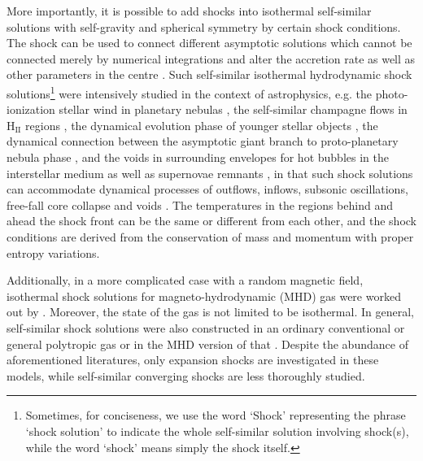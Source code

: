 \documentclass[fleqn,usenatbib]{mnras}
\begin{document}
More importantly, it is possible to add shocks into isothermal self-similar solutions with self-gravity and spherical symmetry by certain shock conditions. The shock can be used to connect different asymptotic solutions which cannot be connected merely by numerical integrations and alter the accretion rate as well as other parameters in the centre \citep{tsai1995protostellar}. Such self-similar isothermal hydrodynamic shock solutions\footnote{Sometimes, for conciseness, we use the word `Shock' representing the phrase `shock solution' to indicate the whole self-similar solution involving shock(s), while the word `shock' means simply the shock itself.} were intensively studied in the context of astrophysics, e.g. the photo-ionization stellar wind in planetary nebulas \citep{chevalier1997expansion}, the self-similar champagne flows in $\mathrm{H_{II}}$ regions \citep{shu2002self}, the dynamical evolution phase of younger stellar objects \citep{shen2004shocked}, the dynamical connection between the asymptotic giant branch to proto-planetary nebula phase \citep{bian2005spherical}, and the voids in surrounding envelopes for hot bubbles in the interstellar medium as well as supernovae remnants \citep{lou2009dynamic}, in that such shock solutions can accommodate dynamical processes of outflows, inflows, subsonic oscillations, free-fall core collapse and voids \citep{bian2005spherical, lou2009dynamic}. The temperatures in the regions behind and ahead the shock front can be the same or different from each other, and the shock conditions are derived from the conservation of mass and momentum with proper entropy variations. 

Additionally, in a more complicated case with a random magnetic field, isothermal shock solutions for magneto-hydrodynamic (MHD) gas were worked out by \citet{yuLou2006}. Moreover, the state of the gas is not limited to be isothermal. In general, self-similar shock solutions were also constructed in an ordinary conventional or general polytropic gas \citep{lou2006self, lou2006new, lou2012dynamic, hu2008self, lou2008self} or in the MHD version of that \citep{wang2008dynamic, lou2010general}. Despite the abundance of aforementioned literatures, only expansion shocks are investigated in these models, while self-similar converging shocks are less thoroughly studied.
\end{document}
